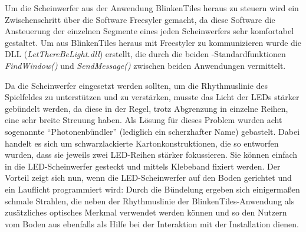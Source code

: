 Um die Scheinwerfer aus der Anwendung BlinkenTiles heraus zu steuern wird ein Zwischenschritt über die Software Freesyler gemacht, da diese Software die Ansteuerung der einzelnen Segmente eines jeden Scheinwerfers sehr komfortabel gestaltet. Um aus BlinkenTiles heraus mit Freestyler zu kommunizieren wurde die DLL (\emph{LetThereBeLight.dll}) erstellt, die durch die beiden \CS{}-Standardfunktionen \emph{FindWindow()} und \emph{SendMessage()} zwischen beiden Anwendungen vermittelt.

Da die Scheinwerfer eingesetzt werden sollten, um die Rhythmuslinie des Spielfeldes zu unterstützen und zu verstärken, musste das Licht der LEDs stärker gebündelt werden, da diese in der Regel, trotz Abgrenzung in einzelne Reihen, eine sehr breite Streuung haben. Als Lösung für dieses Problem wurden acht sogenannte \enquote{Photonenbündler} (lediglich ein scherzhafter Name) gebastelt. Dabei handelt es sich um schwarzlackierte Kartonkonstruktionen, die so entworfen wurden, dass sie jeweils zwei LED-Reihen stärker fokussieren. Sie können einfach in die LED-Scheinwerfer gesteckt und mittels Klebeband fixiert werden. Der Vorteil zeigt sich nun, wenn die LED-Scheinwerfer auf den Boden gerichtet und ein Lauflicht programmiert wird: Durch die Bündelung ergeben sich einigermaßen schmale Strahlen, die neben der Rhythmuslinie der BlinkenTiles-Anwendung als zusätzliches optisches Merkmal verwendet werden können und so den Nutzern vom Boden aus ebenfalls als Hilfe bei der Interaktion mit der Installation dienen.


